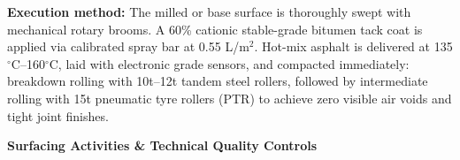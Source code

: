 \noindent
\begin{minipage}[t]{0.185\textwidth}\end{minipage}\hfill
\begin{minipage}[t]{0.185\textwidth}\end{minipage}\hfill
\begin{minipage}[t]{0.185\textwidth}\end{minipage}\hfill
\begin{minipage}[t]{0.185\textwidth}\end{minipage}\hfill
\begin{minipage}[t]{0.185\textwidth}\end{minipage}

\vspace{0.20cm}

\noindent
\begin{tcolorbox}[enhanced, colback=mhoffwhite, colframe=mhlightgray, boxrule=0.7pt, arc=4pt, left=9pt, right=9pt, top=7pt, bottom=7pt, borderline west={3pt}{0pt}{mhgold}, drop shadow=black!4]
    {\fontsize{8.1pt}{11.0pt}\selectfont\color{mhtext}
    \textbf{Execution method:} The milled or base surface is thoroughly swept with mechanical rotary brooms. A 60\% cationic stable-grade bitumen tack coat is applied via calibrated spray bar at 0.55 L/m$^2$. Hot-mix asphalt is delivered at 135$^\circ$C--160$^\circ$C, laid with electronic grade sensors, and compacted immediately: breakdown rolling with 10t--12t tandem steel rollers, followed by intermediate rolling with 15t pneumatic tyre rollers (PTR) to achieve zero visible air voids and tight joint finishes.
    }
\end{tcolorbox}

\vfill

\noindent
{\large\bfseries\color{mhnavy} Surfacing Activities \& Technical Quality Controls}
\vspace{0.10cm}

